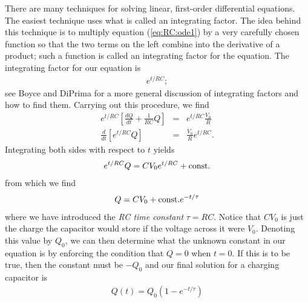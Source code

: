 There are many techniques for solving linear, first-order differential 
equations. The easiest technique uses what is called an integrating factor. 
The idea behind this technique is to multiply equation (\ref{eq:RC:ode1}) by a 
very carefully chosen function so that the two terms on the left combine into 
the derivative of a product; such a function is called an integrating factor 
for the equation. The integrating factor for our equation is
\begin{eqnarray*}
e^{t/RC};
\end{eqnarray*}
see Boyce and DiPrima for a more general discussion of integrating factors and 
how to find them. Carrying out this procedure, we find
\begin{eqnarray*}
e^{t/RC} \left[\frac{dQ}{dt} + \frac{1}{RC}Q \right] & = & e^{t/RC}\frac{V_0}{R}\\
\frac{d}{dt} \left[ e^{t/RC} Q \right] & = & \frac{V_0}{R}e^{t/RC}.
\end{eqnarray*}
Integrating both sides with respect to $t$ yields
\begin{eqnarray*}
e^{t/RC} Q = CV_0 e^{t/RC} + {\rm const.}
\end{eqnarray*}
from which we find
\begin{eqnarray*}
Q = CV_0 + {\rm const.}e^{-t/\tau}
\end{eqnarray*}
where we have introduced the {\em RC time constant} $\tau = RC$. Notice that
$CV_0$ is just the charge the capacitor would store if the voltage across it 
were $V_0$. Denoting this value by $Q_0$, we can then determine what the 
unknown constant in our equation is by enforcing the condition that $Q=0$ 
when $t=0$. If this is to be true, then the constant must be $-Q_0$ and our
final solution for a charging capacitor is
\begin{eqnarray}
Q(t) = Q_0 (1-e^{-t/\tau}) \label{eq:RC:charging}
\end{eqnarray}

